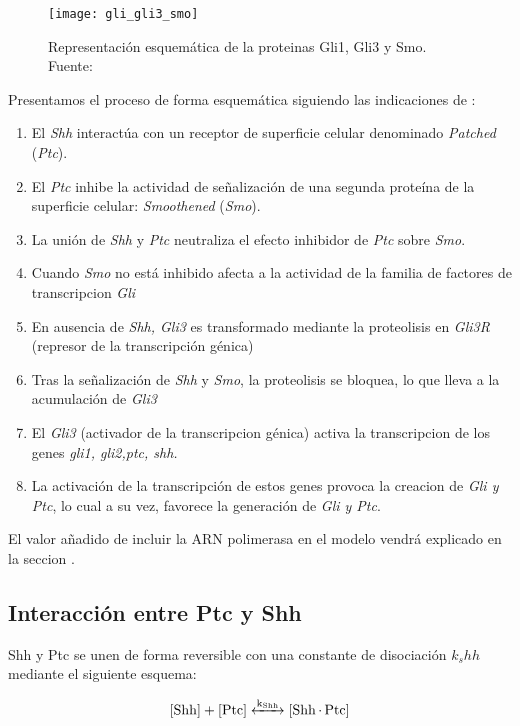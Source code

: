  \begin{figure}[h]
 	\texttt{[image: gli\_gli3\_smo]}
 	\centering
 	\caption{Representación esquemática de la proteinas Gli1, Gli3 y Smo. Fuente: \cite{phosphosite}}
 	\label{figuras}
 \end{figure}
 
 
 
 
 Presentamos el proceso de forma esquemática siguiendo las  indicaciones de \cite{schaffer}:
 \begin{enumerate}
 	\item El \textit{Shh} interactúa con un receptor de superficie celular denominado \textit{Patched }(\textit{Ptc}).
 	\item El \textit{Ptc} inhibe la actividad de señalización de una segunda proteína de la superficie celular: \textit{Smoothened }(\textit{Smo}).
 	\item La unión de \textit{Shh} y \textit{Ptc} neutraliza el efecto inhibidor  de \textit{Ptc} sobre \textit{Smo}.
 	\item Cuando \textit{Smo} no está inhibido afecta a la actividad de la familia de factores de transcripcion \textit{Gli}
 	\item En ausencia de\textit{ Shh, Gli3} es transformado mediante la proteolisis en \textit{Gli3R} (represor de la transcripción génica)
 	\item Tras la señalización de \textit{Shh} y \textit{Smo}, la proteolisis se bloquea, lo que lleva a la acumulación de \textit{Gli3}
 	\item El \textit{Gli3} (activador de la transcripcion génica) activa la transcripcion de los genes \textit{gli1, gli2,ptc, shh.}
 	\item La activación de la transcripción de estos genes provoca la creacion de\textit{ Gli y Ptc}, lo cual a su vez, favorece la generación de \textit{Gli y Ptc}.
 \end{enumerate}
 
 El valor añadido de incluir la ARN polimerasa en el modelo vendrá explicado en la seccion \cite{waseel} .
 
 
 
 \subsection{Interacción entre Ptc y Shh}
 Shh y Ptc se unen de forma reversible con una constante de disociación $k_shh$ mediante el siguiente esquema: 
 
\begin{equation}
\ce{[Shh] + [Ptc] <->[k_{Shh}] [Shh.Ptc] }
\label{s:1}
\end{equation}
 
